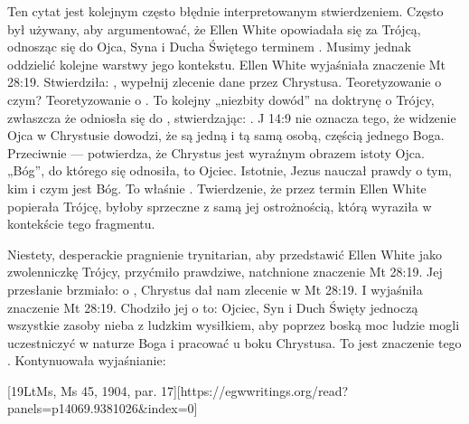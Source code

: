 Ten cytat jest kolejnym często błędnie interpretowanym stwierdzeniem. Często był używany, aby argumentować, że Ellen White opowiadała się za Trójcą, odnosząc się do Ojca, Syna i Ducha Świętego terminem . Musimy jednak oddzielić kolejne warstwy jego kontekstu. Ellen White wyjaśniała znaczenie Mt 28:19. Stwierdziła: , wypełnij zlecenie dane przez Chrystusa. Teoretyzowanie o czym? Teoretyzowanie o . To kolejny „niezbity dowód” na doktrynę o Trójcy, zwłaszcza że odniosła się do , stwierdzając: . J 14:9 nie oznacza tego, że widzenie Ojca w Chrystusie dowodzi, że są jedną i tą samą osobą, częścią jednego Boga. Przeciwnie — potwierdza, że Chrystus jest wyraźnym obrazem istoty Ojca. „Bóg”, do którego się odnosiła, to Ojciec. Istotnie, Jezus nauczał prawdy o tym, kim i czym jest Bóg. To właśnie  . Twierdzenie, że przez termin  Ellen White popierała Trójcę, byłoby sprzeczne z samą jej ostrożnością, którą wyraziła w kontekście tego fragmentu.

Niestety, desperackie pragnienie trynitarian, aby przedstawić Ellen White jako zwolenniczkę Trójcy, przyćmiło prawdziwe, natchnione znaczenie Mt 28:19. Jej przesłanie brzmiało:  o , Chrystus dał nam zlecenie w Mt 28:19. I wyjaśniła znaczenie Mt 28:19. Chodziło jej o to: Ojciec, Syn i Duch Święty jednoczą wszystkie zasoby nieba z ludzkim wysiłkiem, aby poprzez boską moc ludzie mogli uczestniczyć w naturze Boga i pracować u boku Chrystusa. To jest znaczenie tego . Kontynuowała wyjaśnianie:

[19LtMs, Ms 45, 1904, par. 17][https://egwwritings.org/read?panels=p14069.9381026&index=0]

